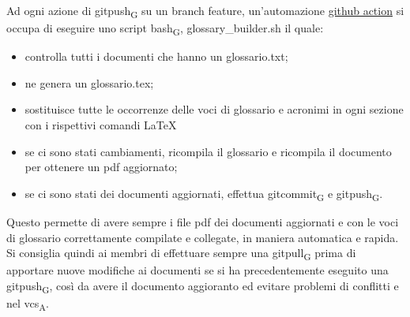     Ad ogni azione di \gls{gitpush}\textsubscript{G} su un branch feature, un'automazione \href{https://docs.github.com/en/free-pro-team@latest/actions}{github action} si occupa di eseguire uno script \gls{bash}\textsubscript{G}, glossary\_builder.sh il quale:
    \begin{itemize}
        \item controlla tutti i documenti che hanno un glossario.txt;
        \item ne genera un glossario.tex;
        \item sostituisce tutte le occorrenze delle voci di glossario e acronimi in ogni sezione con i rispettivi comandi \LaTeX{}
        \item se ci sono stati cambiamenti, ricompila il glossario e ricompila il documento per ottenere un pdf aggiornato;
        \item se ci sono stati dei documenti aggiornati, effettua \gls{gitcommit}\textsubscript{G} e \gls{gitpush}\textsubscript{G}.
    \end{itemize}
    Questo permette di avere sempre i file pdf dei documenti aggiornati e con le voci di glossario correttamente compilate e collegate, in maniera automatica e rapida. Si consiglia quindi ai membri di effettuare sempre una \gls{gitpull}\textsubscript{G} prima di apportare nuove modifiche ai documenti se si ha precedentemente eseguito una \gls{gitpush}\textsubscript{G}, così da avere il documento aggioranto ed evitare problemi di conflitti e nel \acrshort{vcs}\textsubscript{A}.
